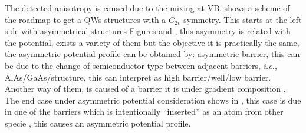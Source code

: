 The detected  anisotropy is caused due to the mixing at \gls{VB}.  shows a scheme of the roadmap to get a \gls{QW}s structures with a $C_{2v}$ symmetry. This starts at the left side with asymmetrical structures Figures and , this asymmetry is related with the potential, exists a variety of them but the objective it is practically the same, the asymmetric potential profile  can be obtained by: asymmetric barrier, this can be due to the change of semiconductor type between adjacent barriers, \textit{i.e.}, AlAs/GaAs/\algaas structure, this can interpret as
high barrier/well/low barrier\cite{koopmans1998microscopic}. Another way of them, is caused of a barrier it is under
gradient composition \cite{english2013effect,eldridge2011spinorbit}. The end case under asymmetric potential consideration shows in , this case is due in one of the barriers which is intentionally ``inserted'' as an atom from other specie \cite{yu2015tuning}, this causes an asymmetric potential profile.
